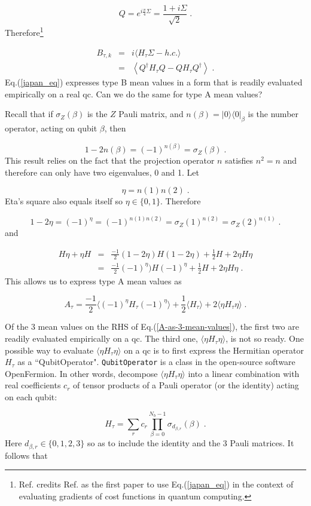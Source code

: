 \documentclass[12pt]{article}
\newcommand{\bra}[1]{\langle#1|}
\newcommand{\ket}[1]{|#1\rangle}
\newcommand{\beq}{\begin{equation}}
\newcommand{\eeq}{\end{equation}}
\newcommand{\beqa}{\begin{eqnarray}}
\newcommand{\eeqa}{\end{eqnarray}}
\begin{document}
{\beq
Q=e^{i\frac{\pi}{4}\Sigma}
=\frac{1 + i\Sigma}{\sqrt{2}}
\;.
\eeq
Therefore\footnote{Ref.\cite{xanadu} credits
Ref.\cite{japan} as the first
paper to use
Eq.(\ref{japan_eq})
in the context of evaluating
gradients of cost functions in quantum computing.}

\beqa
B_{\tau,k} &=& i\langle H_\tau \Sigma - h.c.\rangle\\
&=&
\left\langle
Q^\dagger H_\tau Q
- Q H_\tau Q^\dagger
\right\rangle
\;.
\label{japan_eq}
\eeqa
Eq.(\ref{japan_eq}) expresses type B mean
values in a form
that is readily evaluated empirically on a real
qc. Can we do the same for type A mean values?


Recall that if $\sigma_Z(\beta)$ is the $Z$ Pauli matrix,
and $n(\beta)=\ket{0}\bra{0}_\beta$ is the number operator,
acting on qubit $\beta$,
then

\beq
1-2n(\beta) = (-1)^{n(\beta)} = \sigma_Z(\beta)
\;.
\eeq
This result relies on the fact
that the projection operator $n$
satisfies $n^2=n$  and therefore
can only have two eigenvalues, 0 and 1.
Let

\beq
\eta = n(1)n(2)
\;.
\eeq
Eta's square also equals itself so
$\eta\in \{0, 1\}$. Therefore

\beq
1-2\eta = (-1)^{\eta} = (-1)^{n(1)n(2)} = \sigma_Z(1)^{n(2)}=
\sigma_Z(2)^{n(1)}
\;.
\eeq
and

\beqa
H\eta + \eta H &=&
\frac{-1}{2}(1-2\eta)H(1-2\eta) + \frac{1}{2}H
+ 2\eta H\eta\\
&=&
\frac{-1}{2}(-1)^\eta)H(-1)^\eta + \frac{1}{2}H
+ 2\eta H \eta
\;.
\eeqa
This allows us to express type A mean values as

\beq
A_\tau =\frac{-1}{2}
\langle (-1)^\eta H_\tau (-1)^\eta\rangle
+ \frac{1}{2}\langle H_\tau \rangle
+ 2\langle\eta H_\tau \eta\rangle
\;.
\label{A-as-3-mean-values}
\eeq

Of the 3 mean values on the RHS of
Eq.(\ref{A-as-3-mean-values}),
the first two are readily
evaluated empirically on a qc.
The third one,
$\langle\eta H_\tau \eta\rangle$, is not so ready.
One possible way to evaluate
$\langle\eta H_\tau \eta\rangle$ on a qc
is to first express
the Hermitian operator $H_\tau$
as a ``QubitOperator". {\tt QubitOperator}
is a class
in the open-source software
OpenFermion. In other words, decompose
$\langle\eta H_\tau \eta\rangle$
into a linear combination
 with real coefficients $c_r$
of tensor products of a Pauli operator
(or the identity) acting on each qubit:

\beq
H_\tau = \sum_r c_r \prod_{\beta=0}^{N_b-1}
\sigma_{d_{\beta,r}}(\beta)
\;.
\eeq
Here $d_{\beta,r} \in \{0,1,2,3\}$
so as to include the identity and the 3 Pauli matrices.
It follows that

}
\end{document}
